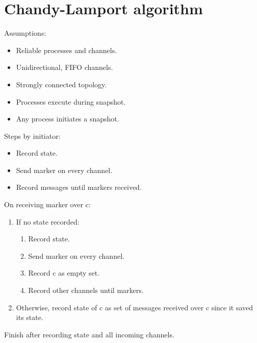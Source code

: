 \section{Chandy-Lamport algorithm}
Assumptions:
\begin{itemize}
    \item Reliable processes and channels.
    \item Unidirectional, FIFO channels.
    \item Strongly connected topology.
    \item Processes execute during snapshot.
    \item Any process initiates a snapshot.
\end{itemize}
Steps by initiator:
\begin{itemize}
    \item Record state.
    \item Send marker on every channel.
    \item Record messages until markers received.
\end{itemize}
On receiving marker over c:
\begin{enumerate}
    \item If no state recorded:
    \begin{enumerate}
        \item Record state.
        \item Send marker on every channel.
        \item Record c as empty set.
        \item Record other channels until markers.
    \end{enumerate}
    \item Otherwise, record state of c as set of messages received over c since it saved its state.
\end{enumerate}
Finish after recording state and all incoming channels.

